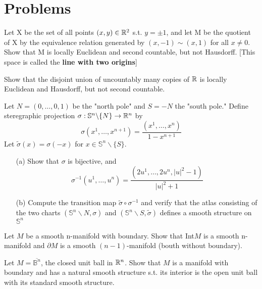 \section{Problems}
\begin{problem}
Let X be the set of all points $(x,y)\in \mathbb{R}^2$ s.t. $y=\pm 1$, and let M be the 
quotient of X by the equivalence relation generated by $(x,-1)\sim (x,1)$ for all
$x\neq 0$. Show that M is locally Euclidean and second countable, but not Hausdorff.
[This space is called the \textbf{line with  two origins}]
\end{problem}
\begin{problem}
Show that the disjoint union of uncountably many copies of $\mathbb{R}$ is locally Euclidean
and Hausdorff, but not second countable.
\end{problem}
\begin{problem}
Let $N=(0,\dots,0,1)$ be the "north pole" and $S=-N$ the "south pole." Define steregraphic
projection $\sigma:\mathbb{S}^n\backslash \{N\}\rightarrow\mathbb{R}^n$ by $$ \sigma(x^1,\dots,x^{n+1})
=\frac{(x^1,\dots,x^n)}{1-x^{n+1}}$$ Let $\tilde{\sigma}(x)=\sigma(-x)$ for $x\in \mathbb{S}^n
\backslash \{S\}$.
\begin{enumerate}
\item[(a)] Show that $\sigma$ is bijective, and $$\sigma^{-1}(u^1,\dots,u^n)=\frac{(2u^1,\dots,2u^n,
|u|^2-1)}{|u|^2+1}$$
\item[(b)] Compute the transition map $\tilde{\sigma}\circ\sigma^{-1}$ and verify that the atlas
consisting of the two charts $(\mathbb{S}^n\backslash{N},\sigma)$ and $(\mathbb{S}^n\backslash{S},
\tilde{\sigma})$ defines a smooth structure on $\mathbb{S}^n$
\end{enumerate}
\end{problem}
\begin{problem}
Let $M$ be a smooth n-manifold with boundary. Show that Int$M$ is a smooth n-manifold and $\partial M$
is a smooth $(n-1)$-manifold (bouth without boundary).
\end{problem}
\begin{problem}
Let $M=\overline{\mathbb{B}^n}$, the closed unit ball in $\mathbb{R}^n$. Show that $M$ is a manifold with
boundary and has a natural smooth structure s.t. its interior is the open unit ball with its standard
smooth structure.
\end{problem}